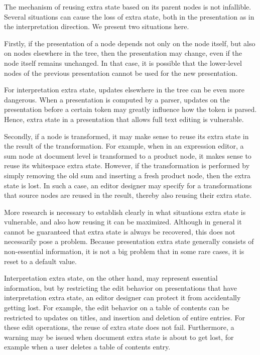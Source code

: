 The mechanism of reusing extra state based on its parent nodes is not infallible. Several situations can cause the loss of extra state, both in the presentation as in the interpretation direction. We present two situations here.

Firstly, if the presentation of a node depends not only on the node itself, but also on nodes elsewhere in the tree, then the presentation may change, even if the node itself remains unchanged. In that case, it is possible that the lower-level nodes of the previous presentation cannot be used for the new presentation. %

For interpretation extra state, updates elsewhere in the tree can be  even more dangerous. When a presentation is computed by a parser, updates on the presentation before a certain token may greatly influence how the token is parsed. Hence, extra state in a presentation that allows full text editing is vulnerable. 


Secondly, if a node is transformed, it may make sense to reuse its extra state in the result of the transformation. For example, when in an expression editor, a sum node at document level is transformed to a product node, it makes sense to reuse its whitespace extra state. However, if the transformation is performed by simply removing the old sum and inserting a fresh product node, then the extra state is lost. In such a case, an editor designer may specify for a transformations that source nodes are reused in the result, thereby also reusing their extra state. 

More research is necessary to establish clearly in what situations extra state is vulnerable, and also how reusing it can be maximized. Although in general it cannot be guaranteed that extra state is always be recovered, this does not necessarily pose a problem. Because presentation extra state generally consists of non-essential information, it is not a big problem that in some rare cases, it is reset to a default value.

Interpretation extra state, on the other hand, may represent essential information, but by restricting the edit behavior on presentations that have interpretation extra state, an editor designer can protect it from accidentally getting lost. For example, the edit behavior on a table of contents can be restricted to updates on titles, and insertion and deletion of entire entries. For these edit operations, the reuse of extra state does not fail. Furthermore, a warning may be issued when document extra state is about to get lost, for example when a user deletes a table of contents entry.

